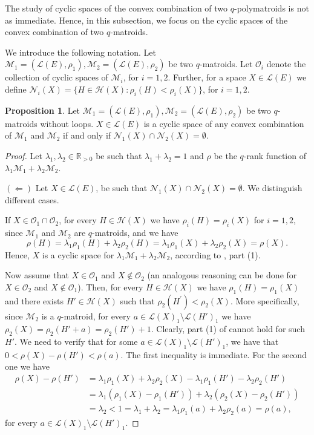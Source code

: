 \documentclass[a4paper,11pt,reqno]{amsart}
\theoremstyle{definition}
\newtheorem{proposition}[theorem]{{{Proposition}}}
\newcommand{\mM}{\mathcal{M}}
\newcommand{\mL}{\mathcal{L}}
\newcommand{\mO}{\mathcal{O}}
\newcommand{\mN}{\mathcal{N}}
\newcommand{\mH}{\mathcal{H}}
\newcommand{\R}{\mathbb R}
\begin{document}
{The study of cyclic spaces of the convex combination of two $q$-polymatroids is not as immediate. Hence, in this subsection, we focus on the cyclic spaces of the convex combination of two $q$-matroids. 

We introduce the following notation.  Let $\mM_1=(\mL(E),\rho_1), \mM_2=(\mL(E),\rho_2)$ be two $q$-matroids. Let $\mO_i$ denote the collection of cyclic spaces of $\mM_i$, for $i=1,2$. Further, for a space $X\in\mL(E)$ we define $\mN_i(X) =\{H\in\mH(X) : \rho_i(H)<\rho_i(X)\}$, for $i=1,2$.

\begin{proposition}\label{prop:cyc_spaces_noloops}
    Let $\mM_1=(\mL(E),\rho_1), \mM_2=(\mL(E),\rho_2)$ be two $q$-matroids {without loops}. $X\in\mL(E)$ is a cyclic space of any convex combination of $\mM_1$ and $\mM_2$ if and only if $\mN_1(X)\cap\mN_2(X)=\emptyset$.
\end{proposition}
\begin{proof}
     Let $\lambda_1,\lambda_2\in\R_{>0}$ be such that $\lambda_1+\lambda_2=1$ and $\rho$ be the $q$-rank function of $\lambda_1\mM_1+\lambda_2\mM_2$.
    
    $(\Longleftarrow)$  
    Let $X\in\mL(E)$, be such that $\mN_1(X)\cap\mN_2(X)=\emptyset$.
    We distinguish different cases. 
    
    If $X\in\mO_1\cap\mO_2$, for every $H\in\mH(X)$ we have $\rho_i(H)=\rho_i(X)$ for $i=1,2$, since $\mM_1$ and $\mM_2$ are $q$-matroids, and we have
    $$\rho(H) = \lambda_1\rho_1(H) + \lambda_2\rho_2(H) = \lambda_1\rho_1(X) + \lambda_2\rho_2(X) = \rho(X).$$
    Hence, $X$ is a cyclic space for $\lambda_1\mM_1+\lambda_2\mM_2$, according to , part (1).
    
    Now assume that $X\in\mO_1$ and $X\notin \mO_2$ (an analogous reasoning can be done for $X\in\mO_2$ and $X\notin \mO_1$). Then, for every $H\in\mH(X)$ we have $\rho_1(H)=\rho_1(X)$ and there exists $H'\in\mH(X)$ such that $\rho_2(H^\prime)<\rho_2(X)$. More specifically, since $\mM_2$ is a $q$-matroid, for every $a\in\mL(X)_1\setminus\mL(H')_1$ we have $\rho_2(X)=\rho_2(H'+a) = \rho_2(H')+1$. Clearly, part (1) of  cannot hold for such~$H'$. We need to verify that for some $a\in\mL(X)_1\setminus\mL(H')_1$, we have that $0<\rho(X)-\rho(H')<\rho(a)$. The first inequality is immediate. For the second one we have
    \begin{align*}
        \rho(X)-\rho(H') &= \lambda_1\rho_1(X) + \lambda_2\rho_2(X) -\lambda_1\rho_1(H') - \lambda_2\rho_2(H') \\
        &=\lambda_1(\rho_1(X) - \rho_1(H')) + \lambda_2(\rho_2(X) - \rho_2(H')) \\
        &=\lambda_2 < 1 = \lambda_1+\lambda_2 = \lambda_1\rho_1(a) + \lambda_2\rho_2(a) =\rho(a),
    \end{align*}
    for every $a\in\mL(X)_1\setminus\mL(H')_1$.
    

\end{proof}}
\end{document}
